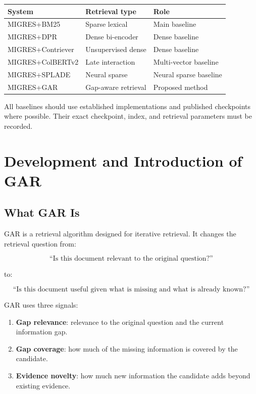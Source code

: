 \documentclass[11pt,a4paper]{article}
\begin{document}
\begin{center}
\begin{tabular}{lll}
\toprule
\textbf{System} & \textbf{Retrieval type} & \textbf{Role}\\
\midrule
MIGRES+BM25 & Sparse lexical & Main baseline\\
MIGRES+DPR & Dense bi-encoder & Dense baseline\\
MIGRES+Contriever & Unsupervised dense & Dense baseline\\
MIGRES+ColBERTv2 & Late interaction & Multi-vector baseline\\
MIGRES+SPLADE & Neural sparse & Neural sparse baseline\\
MIGRES+GAR & Gap-aware retrieval & Proposed method\\
\bottomrule
\end{tabular}
\end{center}

All baselines should use established implementations and published checkpoints where possible. Their exact checkpoint, index, and retrieval parameters must be recorded.

\section{Development and Introduction of GAR}

\subsection{What GAR Is}

GAR is a retrieval algorithm designed for iterative retrieval. It changes the retrieval question from:

\[
\text{``Is this document relevant to the original question?''}
\]

to:

\[
\text{``Is this document useful given what is missing and what is already known?''}
\]

GAR uses three signals:

\begin{enumerate}[leftmargin=1.5em]
\item \textbf{Gap relevance}: relevance to the original question and the current information gap.
\item \textbf{Gap coverage}: how much of the missing information is covered by the candidate.
\item \textbf{Evidence novelty}: how much new information the candidate adds beyond existing evidence.
\end{enumerate}
\end{document}
